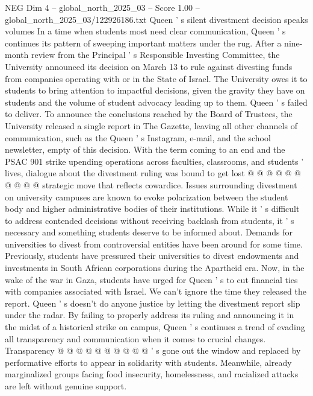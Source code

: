 \begin{textsample}{NEG Dim 4 – global\_north\_2025\_03 – Score 1.00 – global\_north\_2025\_03/122926186.txt}  \label{ex:f4_neg_400}
Queen ' s silent divestment decision speaks volumes In a time when students most need clear communication, Queen ' s continues its pattern of sweeping important matters under the rug.
After a nine-month review from the Principal ' s Responsible Investing Committee, the University announced its decision on March 13 to rule against divesting funds from companies operating with or in the State of Israel.
The University owes it to students to bring attention to impactful decisions, given the gravity they have on students and the volume of student advocacy leading up to them.
Queen ' s failed to deliver.
To announce the conclusions reached by the Board of Trustees, the University released a single report in The Gazette, leaving all other channels of communication, such as the Queen ' s Instagram, e-mail, and the school newsletter, empty of this decision.
With the term coming to an end and the PSAC 901 strike upending operations across faculties, classrooms, and students ' lives, dialogue about the divestment ruling was bound to get lost @ @ @ @ @ @ @ @ @ @ strategic move that reflects cowardice.
Issues surrounding divestment on university campuses are known to evoke polarization between the student body and higher administrative bodies of their institutions.
While it ' s difficult to address contended decisions without receiving backlash from students, it ' s necessary and something students deserve to be informed about.
Demands for universities to divest from controversial entities have been around for some time.
Previously, students have pressured their universities to divest endowments and investments in South African corporations during the Apartheid era.
Now, in the wake of the war in Gaza, students have urged for Queen ' s to cut financial ties with companies associated with Israel.
We can't ignore the time they released the report.
Queen ' s doesn't do anyone justice by letting the divestment report slip under the radar.
By failing to properly address its ruling and announcing it in the midst of a historical strike on campus, Queen ' s continues a trend of evading all transparency and communication when it comes to crucial changes.
Transparency @ @ @ @ @ @ @ @ @ @ ' s gone out the window and replaced by performative efforts to appear in solidarity with students.
Meanwhile, already marginalized groups facing food insecurity, homelessness, and racialized attacks are left without genuine support.

\end{textsample}
